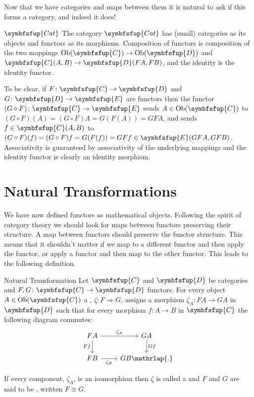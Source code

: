 \documentclass[fleqn]{NotesClass}
\makeatletter
\newcommand{\cat}[1]{\symbfsfup{#1}}
\newcommand{\c@egory}[1]{\symbfsfup{#1}}
\newcommand{\Cat}{\c@egory{Cat}}
\DeclareMathOperator{\Ob}{Ob}
\newcommand{\isomorphic}{\cong}
\newcommand{\naturalTransformation}{\Rightarrow}
\makeatother
\begin{document}
    Now that we have categories and maps between them it is natural to ask if this forms a category, and indeed it does!
    
    \begin{dfn}{\normalsize\(\Cat\)}{}
        The category \(\Cat\)\index{Cat@\(\Cat\)} has (small) categories as its objects and functors as its morphisms.
        Composition of functors is composition of the two mappings \(\Ob(\cat{C}) \to \Ob(\cat{D})\) and \(\cat{C}(A, B) \to \cat{D}(FA, FB)\), and the identity is the identity functor.
    \end{dfn}
    
    To be clear, if \(F \colon \cat{C} \to \cat{D}\) and \(G \colon \cat{D} \to \cat{E}\) are functors then the functor \((G \circ F) \colon \cat{C} \to \cat{E}\) sends \(A \in \Ob(\cat{C})\) to \((G \circ F)(A) = (G \circ F)A = G(F(A)) = GFA\), and sends \(f \in \cat{C}(A, B)\) to \((G \circ F)(f) = (G \circ F)f = G(F(f)) = GFf \in \cat{E}(GFA, GFB)\).
    Associativity is guaranteed by associativity of the underlying mappings and the identity functor is clearly an identity morphism.
    
    \section{Natural Transformations}
    We have now defined functors as mathematical objects.
    Following the spirit of category theory we should look for maps between functors preserving their structure.
    A map between functors should preserve the functor structure.
    This means that it shouldn't matter if we map to a different functor and then apply the functor, or apply a functor and then map to the other functor.
    This leads to the following definition.
    
    \begin{dfn}{Natural Transformation}{}
        Let \(\cat{C}\) and \(\cat{D}\) be categories and \(F, G \colon \cat{C} \to \cat{D}\) functors.
        For every object \(A \in \Ob(\cat{C})\) a , \(\zeta \colon F \naturalTransformation G\), assigns a morphism \(\zeta_A \colon FA \to GA\) in \(\cat{D}\) such that for every morphism \(f \colon A \to B\) in \(\cat{C}\) the following diagram commutes:
        \begin{equation}
            \begin{tikzcd}
                FA \arrow[r, "\zeta_A"] \arrow[d, "Ff"'] & GA \arrow[d, "Gf"]\\
                FB \arrow[r, "\zeta_B"'] & GB\mathrlap{.}
            \end{tikzcd}
        \end{equation}
        
        If every component, \(\zeta_A\), is an isomorphism then \(\zeta\) is called a  and \(F\) and \(G\) are said to be , written \(F \isomorphic G\).
    \end{dfn}
    
\end{document}
